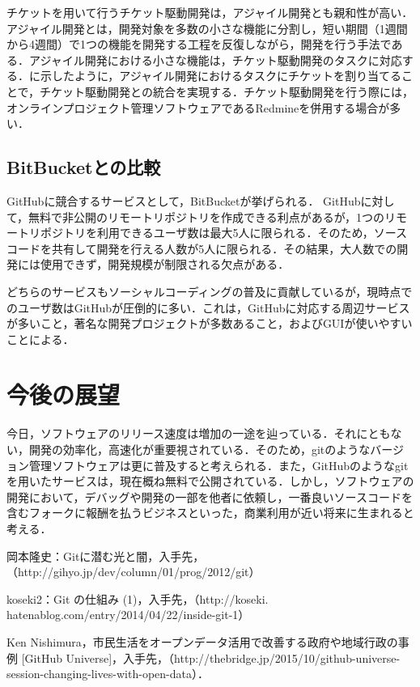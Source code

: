 \documentclass[a4j,9pt,twocolumn]{jsarticle}
\begin{document}
チケットを用いて行うチケット駆動開発は，アジャイル開発とも親和性が高い．アジャイル開発とは，開発対象を多数の小さな機能に分割し，短い期間（1週間から4週間）で1つの機能を開発する工程を反復しながら，開発を行う手法である．アジャイル開発における小さな機能は，チケット駆動開発のタスクに対応する．に示したように，アジャイル開発におけるタスクにチケットを割り当てることで，チケット駆動開発との統合を実現する．チケット駆動開発を行う際には，オンラインプロジェクト管理ソフトウェアであるRedmineを併用する場合が多い．

\subsection{BitBucketとの比較}
GitHubに競合するサービスとして，BitBucketが挙げられる． GitHubに対して，無料で非公開のリモートリポジトリを作成できる利点があるが，1つのリモートリポジトリを利用できるユーザ数は最大5人に限られる．そのため，ソースコードを共有して開発を行える人数が5人に限られる．その結果，大人数での開発には使用できず，開発規模が制限される欠点がある．

どちらのサービスもソーシャルコーディングの普及に貢献しているが，現時点でのユーザ数はGitHubが圧倒的に多い．これは，GitHubに対応する周辺サービスが多いこと，著名な開発プロジェクトが多数あること，およびGUIが使いやすいことによる．

\section{今後の展望}
今日，ソフトウェアのリリース速度は増加の一途を辿っている．それにともない，開発の効率化，高速化が重要視されている．そのため，gitのようなバージョン管理ソフトウェアは更に普及すると考えられる．また，GitHubのようなgitを用いたサービスは，現在概ね無料で公開されている．しかし，ソフトウェアの開発において，デバッグや開発の一部を他者に依頼し，一番良いソースコードを含むフォークに報酬を払うビジネスといった，商業利用が近い将来に生まれると考える．

\small
\begin{thebibliography}{99}
岡本隆史：Gitに潜む光と闇，入手先，（http://gihyo.jp/dev/column/01/prog/2012/git）

koseki2：Git の仕組み (1)，入手先，（http://koseki.\\hatenablog.com/entry/2014/04/22/inside-git-1）

Ken Nishimura，市民生活をオープンデータ活用で改善する政府や地域行政の事例 [GitHub Universe]，入手先，（http://thebridge.jp/2015/10/github-universe-session-changing-lives-with-open-data）．
\end{thebibliography}
\end{document}
